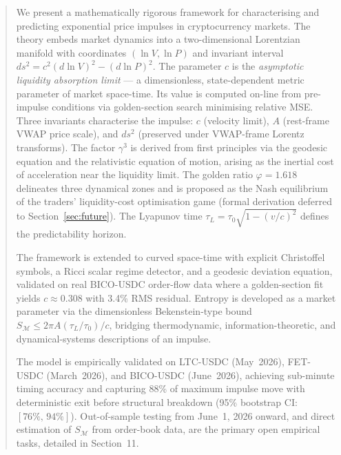 \documentclass[12pt,a4paper]{article}
\begin{document}
\begin{abstract}
We present a mathematically rigorous framework for characterising and
predicting exponential price impulses in cryptocurrency markets. The
theory embeds market dynamics into a two-dimensional Lorentzian manifold
with coordinates $(\ln V,\ln P)$ and invariant interval $ds^2 =
c^2(d\ln V)^2 - (d\ln P)^2$. The parameter $c$ is the \emph{asymptotic
liquidity absorption limit} --- a dimensionless, state-dependent metric
parameter of market space-time. Its value is computed on-line from
pre-impulse conditions via golden-section search minimising relative MSE.
Three invariants characterise the impulse: $c$ (velocity limit), $A$
(rest-frame VWAP price scale), and $ds^2$ (preserved under VWAP-frame
Lorentz transforms). The factor $\gamma^3$ is derived from first
principles via the geodesic equation and the relativistic equation of
motion, arising as the inertial cost of acceleration near the liquidity
limit. The golden ratio $\varphi = 1.618$ delineates three dynamical
zones and is proposed as the Nash equilibrium of the traders'
liquidity-cost optimisation game (formal derivation deferred to
Section~\ref{sec:future}). The Lyapunov time
$\tau_L=\tau_0\sqrt{1-(v/c)^2}$ defines the predictability horizon.

The framework is extended to curved space-time with explicit Christoffel
symbols, a Ricci scalar regime detector, and a geodesic deviation
equation, validated on real BICO-USDC order-flow data where a
golden-section fit yields $c\approx0.308$ with 3.4\% RMS residual.
Entropy is developed as a market parameter via the dimensionless
Bekenstein-type bound $S_{\mathcal{M}} \leq 2\pi A(\tau_L/\tau_0)/c$,
bridging thermodynamic, information-theoretic, and dynamical-systems
descriptions of an impulse.

The model is empirically validated on LTC-USDC (May~2026), FET-USDC
(March~2026), and BICO-USDC (June~2026), achieving sub-minute timing
accuracy and capturing 88\% of maximum impulse move with deterministic
exit before structural breakdown (95\% bootstrap CI: $[76\%,\,94\%]$).
Out-of-sample testing from June~1, 2026 onward, and direct estimation of
$S_{\mathcal{M}}$ from order-book data, are the primary open empirical
tasks, detailed in Section~11.
\end{abstract}

\tableofcontents
\newpage

\end{document}
